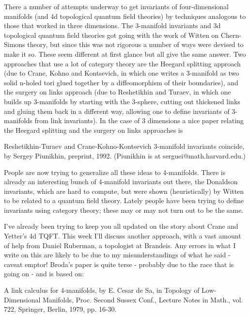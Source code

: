 

There a number of attempts underway to get invariants of four-dimensional manifolds (and 4d topological quantum field theories) by techniques analogous to those that worked in three dimensions. The 3-manifold invariants and 3d topological quantum field theories got going with the work of Witten on Chern-Simons theory, but since this was not rigorous a number of ways were devised to make it so. These seem different at first glance but all give the same answer. Two approaches that use a lot of category theory are the Heegard splitting approach (due to Crane, Kohno and Kontsevich, in which one writes a 3-manifold as two solid n-holed tori glued together by a diffeomorphism of their boundaries), and the surgery on links approach (due to Reshetikhin and Turaev, in which one builds up 3-manifolds by starting with the 3-sphere, cutting out thickened links and gluing them back in a different way, allowing one to define invariants of 3-manifolds from link invariants). In the case of 3 dimensions a nice paper relating the Heegard splitting and the surgery on links approaches is

Reshetikhin-Turaev and Crane-Kohno-Kontsevich 3-manifold invariants coincide, by Sergey Piunikhin, preprint, 1992. (Piunikhin is at serguei@math.harvard.edu.)

People are now trying to generalize all these ideas to 4-manifolds. There is already an interesting bunch of 4-manifold invariants out there, the Donaldson invariants, which are hard to compute, but were shown (heuristically) by Witten to be related to a quantum field theory. Lately people have been trying to define invariants using category theory; these may or may not turn out to be the same.

I've already been trying to keep you all updated on the story about Crane and Yetter's 4d TQFT. This week I'll discuss another approach, with a vast amount of help from Daniel Ruberman, a topologist at Brandeis. Any errors in what I write on this are likely to be due to my misunderstandings of what he said - caveat emptor! Broda's paper is quite terse - probably due to the race that is going on - and is based on:

A link calculus for 4-manifolds, by E. Cesar de Sa, in Topology of Low-Dimensional Manifolds, Proc. Second Sussex Conf., Lecture Notes in Math., vol. 722, Springer, Berlin, 1979, pp. 16-30.

